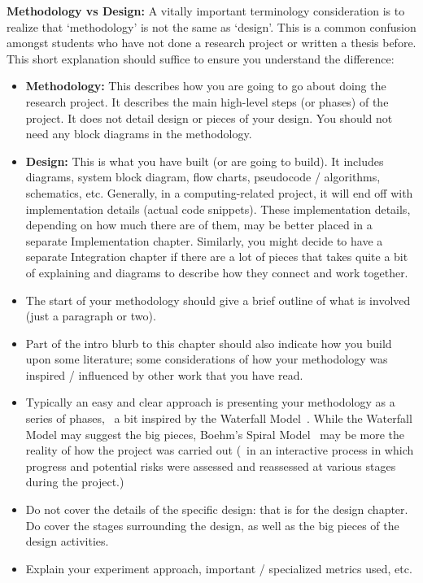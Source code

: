 \textbf{Methodology vs Design:} A vitally important terminology consideration is to realize that `methodology' is not the same as `design'.  This is a common confusion amongst students who have not done a research project or written a thesis before. This short explanation should suffice to ensure you understand the difference:

\begin{itemize}
  \item \textbf{Methodology:} This describes how you are going to go about doing the research project. It describes the main high-level steps (or phases) of the project. It does not detail design or pieces of your design. You should not need any block diagrams in the methodology.

  \item \textbf{Design:} This is what you have built (or are going to build). It includes diagrams, system block diagram, flow charts, pseudocode / algorithms, schematics, etc.  Generally, in a computing-related project, it will end off with implementation details (actual code snippets).  These implementation details, depending on how much there are of them, may be better placed in a separate Implementation chapter.  Similarly, you might decide to have a separate Integration chapter if there are a lot of pieces that takes quite a bit of explaining and diagrams to describe how they connect and work together. 
\end{itemize}


\begin{itemize}
  \item The start of your methodology should give a brief outline of what is involved (just a paragraph or two). 
      
  \item Part of the intro blurb to this chapter should also indicate how you build upon some literature; some considerations of how your methodology was inspired / influenced by other work that you have read.
  	
  \item Typically an easy and clear approach is presenting your methodology as a series of phases, \ie~a bit inspired by the Waterfall Model~\cite{Royce_1970}.  While the Waterfall Model may suggest the big pieces, Boehm's Spiral Model~\cite{Boehm_1988} may be more the reality of how the project was carried out (\ie~in an interactive process in which progress and potential risks were assessed and reassessed at various stages during the project.)
  	
  \item Do not cover the details of the specific design: that is for the design chapter.  Do cover the stages surrounding the design, as well as the big pieces of the design activities.
  	
  \item Explain your experiment approach, important / specialized metrics used, etc.
\end{itemize}

